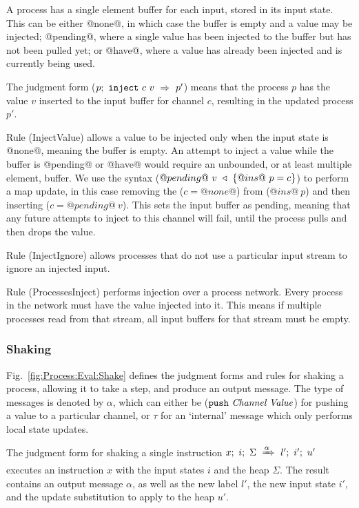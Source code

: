 A process has a single element buffer for each input, stored in its input state.
This can be either @none@, in which case the buffer is empty and a value may be injected; @pending@, where a single value has been injected to the buffer but has not been pulled yet; or @have@, where a value has already been injected and is currently being used.

The judgment form ($\ProcInject{p}{c}{v}{p'}$) means that the process $p$ has the value $v$ inserted to the input buffer for channel $c$, resulting in the updated process $p'$.

Rule (InjectValue) allows a value to be injected only when the input state is @none@, meaning the buffer is empty.
An attempt to inject a value while the buffer is @pending@ or @have@ would require an unbounded, or at least multiple element, buffer.
We use the syntax ($\HeapUpdateOne{@ins@~p}{c}{@pending@~v}$) to perform a map update, in this case removing the ($c=@none@$) from ($@ins@~p$) and then inserting ($c=@pending@~v$).
This sets the input buffer as pending, meaning that any future attempts to inject to this channel will fail, until the process pulls and then drops the value.

Rule (InjectIgnore) allows processes that do not use a particular input stream to ignore an injected input.

Rule (ProcessesInject) performs injection over a process network.
Every process in the network must have the value injected into it.
This means if multiple processes read from that stream, all input buffers for that stream must be empty.

\subsubsection{Shaking}
Fig.~\ref{fig:Process:Eval:Shake} defines the judgment forms and rules for shaking a process, allowing it to take a step, and produce an output message.
The type of messages is denoted by $\alpha$, which can either be ($\Push~\Chan~\Value$) for pushing a value to a particular channel, or $\tau$ for an `internal' message which only performs local state updates.


The judgment form for shaking a single instruction $\ProcBlockShake{x}{i}{\Sigma}{\alpha}{l'}{i'}{u'}$
executes an instruction $x$ with the input states $i$ and the heap $\Sigma$.
The result contains an output message $\alpha$, as well as the new label $l'$, the new input state $i'$, and the update substitution to apply to the heap $u'$.

